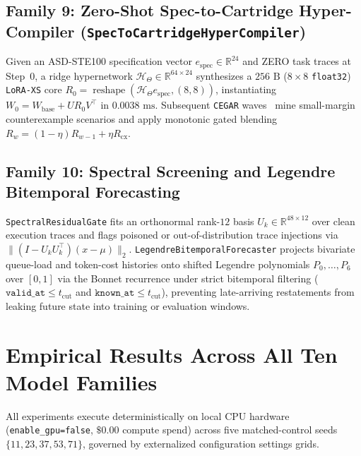 \documentclass[11pt,a4paper]{article}
\begin{document}
\subsection{Family 9: Zero-Shot Spec-to-Cartridge Hyper-Compiler (\texttt{SpecToCartridgeHyperCompiler})}
Given an ASD-STE100 specification vector $e_{\text{spec}} \in \mathbb{R}^{24}$ and ZERO task traces at Step~$0$, a ridge hypernetwork $\mathcal{H}_\Theta \in \mathbb{R}^{64 \times 24}$ synthesizes a $256\text{ B}$ ($8 \times 8$ \texttt{float32}) \texttt{LoRA-XS} core $R_0 = \operatorname{reshape}(\mathcal{H}_\Theta e_{\text{spec}}, (8, 8))$, instantiating $W_0 = W_{\text{base}} + U R_0 V^\top$ in $0.0038\text{ ms}$. Subsequent \texttt{CEGAR} waves~\cite{clarke2000} mine small-margin counterexample scenarios and apply monotonic gated blending $R_{w} = (1-\eta) R_{w-1} + \eta R_{\text{cx}}$.

\subsection{Family 10: Spectral Screening and Legendre Bitemporal Forecasting}
\texttt{SpectralResidualGate} fits an orthonormal rank-$12$ basis $U_k \in \mathbb{R}^{48 \times 12}$ over clean execution traces and flags poisoned or out-of-distribution trace injections via $\|(I - U_k U_k^\top)(x - \mu)\|_2$. \texttt{LegendreBitemporalForecaster} projects bivariate queue-load and token-cost histories onto shifted Legendre polynomials $P_0,\dots,P_6$ over $[0,1]$ via the Bonnet recurrence under strict bitemporal filtering ($\texttt{valid\_at} \le t_{\text{cut}}$ and $\texttt{known\_at} \le t_{\text{cut}}$), preventing late-arriving restatements from leaking future state into training or evaluation windows.

\section{Empirical Results Across All Ten Model Families}

All experiments execute deterministically on local CPU hardware (\texttt{enable\_gpu=false}, $\$0.00$ compute spend) across five matched-control seeds $\{11, 23, 37, 53, 71\}$, governed by externalized configuration settings grids.
\end{document}
